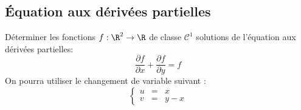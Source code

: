 \documentclass[a4paper,twoside,french,11pt]{VcCours}
\begin{document}
\subsection{Équation aux dérivées partielles}




\begin{Exercice}{} Déterminer les fonctions $f : \R^{2} \rightarrow \R$ de classe $\mathcal{C}^{1}$ solutions de l'équation aux dérivées partielles:
  \[
  \frac{\partial f}{\partial x} + \frac{\partial f}{\partial y} = f
  \]
On pourra utiliser le changement de variable suivant :
  \[
  \left\lbrace\begin{array}{lll}
    u & = &  x \\
    v & = & y - x
  \end{array}\right.
  \]
\end{Exercice} 

\end{document}
